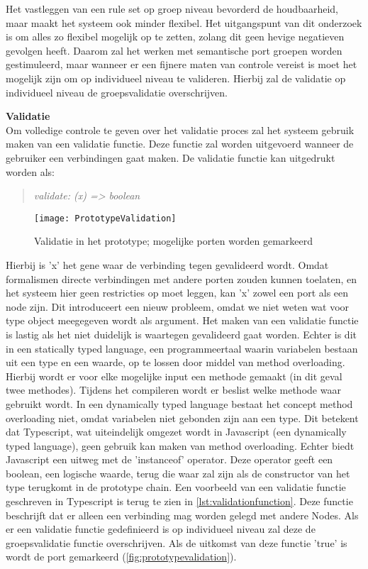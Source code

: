 Het vastleggen van een rule set op groep niveau bevorderd de houdbaarheid, maar maakt het systeem ook minder flexibel. Het uitgangspunt van dit onderzoek is om alles zo flexibel mogelijk op te zetten, zolang dit geen hevige negatieven gevolgen heeft. Daarom zal het werken met semantische port groepen worden gestimuleerd, maar wanneer er een fijnere maten van controle vereist is moet het mogelijk zijn om op individueel niveau te valideren. Hierbij zal de validatie op individueel niveau de groepsvalidatie overschrijven.
\newline

\noindent\textbf{Validatie}\\
Om volledige controle te geven over het validatie proces zal het systeem gebruik maken van een validatie functie. Deze functie zal worden uitgevoerd wanneer de gebruiker een verbindingen gaat maken. De validatie functie kan uitgedrukt worden als:

\begin{quote} 
    \centering    
    \textit{
        validate: (x) =\textgreater{} boolean
    }
\end{quote}

\begin{wrapfigure}{r}{0.4\textwidth}
    \centering    
    \texttt{[image: PrototypeValidation]}
    \caption{Validatie in het prototype; mogelijke porten worden gemarkeerd}
    \label{fig:prototypevalidation}
\end{wrapfigure}

Hierbij is 'x' het gene waar de verbinding tegen gevalideerd wordt. Omdat formalismen directe verbindingen met andere porten zouden kunnen toelaten, en het systeem hier geen restricties op moet leggen, kan 'x' zowel een port als een node zijn. Dit introduceert een nieuw probleem, omdat we niet weten wat voor type object meegegeven wordt als argument. Het maken van een validatie functie is lastig als het niet duidelijk is waartegen gevalideerd gaat worden. Echter is dit in een statically typed language, een programmeertaal waarin variabelen bestaan uit een type en een waarde, op te lossen door middel van method overloading. Hierbij wordt er voor elke mogelijke input een methode gemaakt (in dit geval twee methodes). Tijdens het compileren wordt er beslist welke methode waar gebruikt wordt. In een dynamically typed language bestaat het concept method overloading niet, omdat variabelen niet gebonden zijn aan een type. Dit betekent dat Typescript, wat uiteindelijk omgezet wordt in Javascript (een dynamically typed language), geen gebruik kan maken van method overloading. Echter biedt Javascript een uitweg met de 'instanceof' operator. Deze operator geeft een boolean, een logische waarde, terug die waar zal zijn als de constructor van het type terugkomt in de prototype chain. Een voorbeeld van een validatie functie geschreven in Typescript is terug te zien in 
\autoref{lst:validationfunction}. Deze functie beschrijft dat er alleen een verbinding mag worden gelegd met andere Nodes. Als er een validatie functie gedefinieerd is op individueel niveau zal deze de groepsvalidatie functie overschrijven. Als de uitkomst van deze functie 'true' is wordt de port gemarkeerd (\autoref{fig:prototypevalidation}).

